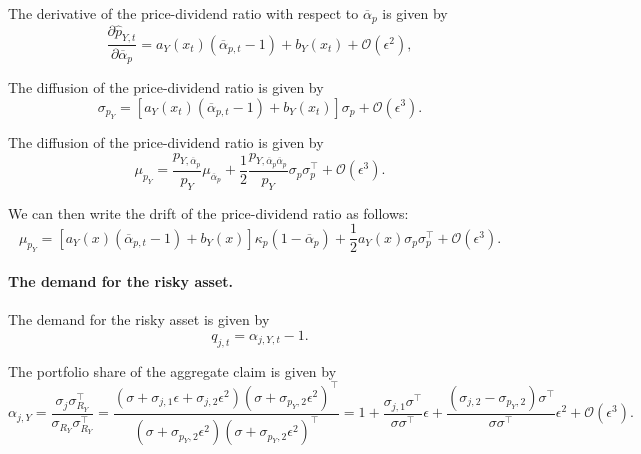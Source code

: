 The derivative of the price-dividend ratio with respect to $\overline{\alpha}_p$ is given by
\begin{equation}
    \frac{\partial \hat{p}_{Y,t}}{\partial \overline{\alpha}_p} = a_{Y}(x_t) (\overline{\alpha}_{p,t}-1) + b_{Y}(x_t)+ \mathcal{O}(\epsilon^2),
\end{equation}

The diffusion of the price-dividend ratio is given by
\begin{equation}
    \sigma_{p_Y} = \left[ a_Y(x_t) (\overline{\alpha}_{p,t}-1) + b_Y(x_t) \right] \sigma_p +\mathcal{O}(\epsilon^3).
\end{equation}

The diffusion of the price-dividend ratio is given by
\begin{equation}
    \mu_{p_Y} = \frac{p_{Y,\overline{\alpha}_p}}{p_{Y}} \mu_{\overline{\alpha}_p} + \frac{1}{2} \frac{p_{Y,\overline{\alpha}_p\overline{\alpha}_p}}{p_{Y}} \sigma_p \sigma_p^\top + \mathcal{O}(\epsilon^3).
\end{equation}

We can then write the drift of the price-dividend ratio as follows:
\begin{equation}
    \mu_{p_Y} = [a_Y(x) (\overline{\alpha}_{p,t}-1) + b_Y(x)] \kappa_p(1-\overline{\alpha}_p) + \frac{1}{2} a_Y(x) \sigma_p \sigma_p^\top + \mathcal{O}(\epsilon^3).
\end{equation}

\paragraph{The demand for the risky asset.} The demand for the risky asset is given by  
\begin{equation}    
    q_{j,t} = \alpha_{j,Y,t} -1.
\end{equation}

The portfolio share of the aggregate claim is given by  
\begin{equation}
    \alpha_{j,Y} =  \frac{\sigma_{j} \sigma_{R_Y}^\top}{\sigma_{R_Y} 
    \sigma_{R_Y}^\top} =  \frac{(\sigma+\sigma_{j,1} \epsilon + \sigma_{j,2} \epsilon^2) (\sigma + \sigma_{p_Y,2} \epsilon^2)^\top}{(\sigma + \sigma_{p_Y,2} \epsilon^2)(\sigma + \sigma_{p_Y,2} \epsilon^2)^\top} = 1 + \frac{\sigma_{j,1} \sigma^\top}{\sigma \sigma^\top} \epsilon + \frac{(\sigma_{j,2} -\sigma_{p_Y,2})\sigma^\top}{\sigma \sigma^\top} \epsilon^2 + \mathcal{O}(\epsilon^3).
\end{equation}


